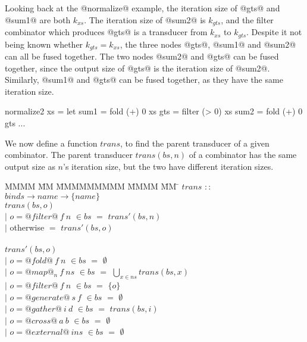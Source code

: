 Looking back at the @normalize@ example, the iteration size of @gts@ and @sum1@ are both $k_{xs}$.
The iteration size of @sum2@ is $k_{gts}$, and the filter combinator which produces @gts@ is a transducer from $k_{xs}$ to $k_{gts}$. 
Despite it not being known whether $k_{gts} = k_{xs}$, the three nodes @gts@, @sum1@ and @sum2@ can all be fused together.
The two nodes @sum2@ and @gts@ can be fused together, since the output size of @gts@ is the iteration size of @sum2@.
Similarly, @sum1@ and @gts@ can be fused together, as they have the same iteration size.
\begin{code}
 normalize2 xs
  = let sum1 = fold   (+)  0   xs
        gts  = filter (> 0)    xs
        sum2 = fold   (+)  0   gts
        ...
\end{code}

We now define a function $trans$, to find the parent transducer of a given combinator.
The parent transducer $trans(bs, n)$ of a combinator has the same output size as $n$'s iteration size, but the two have different iteration sizes.

\begin{tabbing}
MMMM \= MM \= MMMMMMMMM \= MMMM \= MM \= \kill
$trans$  \>$::$\> $binds \rightarrow name \rightarrow \{name\}$ \\
$trans(bs,o)$    \\
            \> $|$ \> $o = @filter@~f~n$    \> $\in bs$ \> $=$ \> $trans'(bs,n)$ \\
            \> $|$ \> otherwise             \>          \> $=$ \> $trans'(bs,o)$ \\
\\
$trans'(bs,o)$    \\
            \> $|$ \> $o = @fold@~f~n$      \> $\in bs$ \> $=$ \> $\emptyset$ \\
            \> $|$ \> $o = @map@_n~f~ns$    \> $\in bs$ \> $=$ \> $\bigcup_{x \in ns} trans(bs, x)$ \\
            \> $|$ \> $o = @filter@~f~n$    \> $\in bs$ \> $=$ \> $\{o\}$       \\
            \> $|$ \> $o = @generate@~s~f$  \> $\in bs$ \> $=$ \> $\emptyset$ \\
            \> $|$ \> $o = @gather@~i~d$    \> $\in bs$ \> $=$ \> $trans(bs,i)$ \\
            \> $|$ \> $o = @cross@~a~b$     \> $\in bs$ \> $=$ \> $\emptyset$ \\
            \> $|$ \> $o = @external@~ins$  \> $\in bs$ \> $=$ \> $\emptyset$ \\
\end{tabbing}

